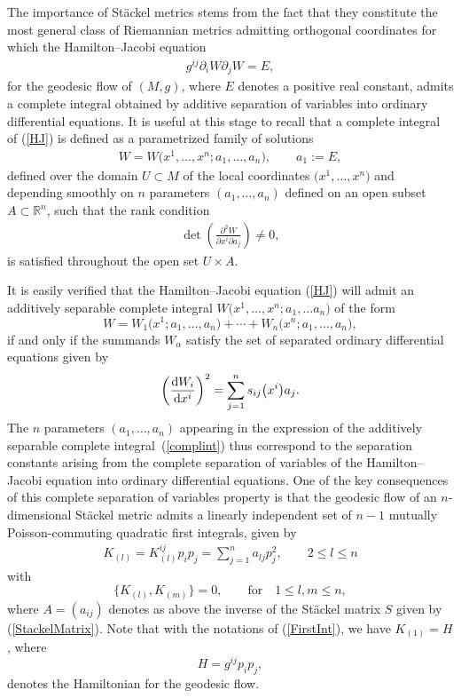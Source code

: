 \documentclass[pdftex]{sigma}
\numberwithin{equation}{section}
\begin{document}
The importance of St\"ackel metrics stems from the fact that they constitute the most general class of Riemannian metrics admitting orthogonal coordinates for which the Hamilton--Jacobi equation
\begin{gather}\label{HJ}
g^{ij}\partial_{i}W\partial_{j}W=E,
\end{gather}
for the geodesic flow of $(M,g)$, where $E$ denotes a positive real constant, admits a complete integral obtained by additive separation of variables into ordinary differential equations. It is useful at this stage to recall that a complete integral of (\ref{HJ}) is defined as a parametrized family of solutions
\begin{gather}\label{complint}
W=W\big(x^{1},\dots,x^{n};a_{1},\dots,a_{n}\big),\qquad a_{1}:=E,
\end{gather}
defined over the domain $U\subset M$ of the local coordinates $\big(x^{1},\dots,x^{n}\big)$ and depending smoothly on $n$ parameters $(a_{1},\dots,a_{n})$ defined on an open subset $A\subset {\mathbb{R}}^{n}$, such that the rank condition
\begin{gather*}%
\det \left(\frac{\partial^{2}W}{\partial x^{i}\partial a_{j}}\right) \neq 0,
\end{gather*}
is satisfied throughout the open set $U\times A$.

It is easily verified that the Hamilton--Jacobi equation (\ref{HJ}) will admit an additively separable complete integral $W\big(x^{1},\dots, x^{n};a_{1},\dots a_{n}\big)$ of the form
\[
W=W_{1}\big(x^{1};a_{1},\dots, a_{n}\big)+\cdots+W_{n}\big(x^{n};a_{1},\dots, a_{n}\big),
\]
if and only if the summands $W_{\alpha}$ satisfy the set of separated ordinary differential equations given by
\[
\left(\frac{{\rm d}W_{i}}{{\rm d}x^{i}}\right)^{2}=\sum_{j=1}^{n}s_{ij}\big(x^{i}\big)a_{j}.
\]
The $n$ parameters $(a_{1},\dots , a_{n})$ appearing in the expression of the additively separable complete integral~(\ref{complint}) thus correspond to the separation constants arising from the complete separation of variables of the Hamilton--Jacobi equation into ordinary differential equations.
One of the key consequences of this complete separation of variables property is that the geodesic flow of an $n$-dimensional St\"ackel metric admits a linearly independent set of $n-1$ mutually Poisson-commuting quadratic first integrals, given by
\begin{gather}\label{FirstInt}
K_{(l)} = K_{(l)}^{ij} p_i p_j = \sum_{j=1}^{n}a_{lj} p_{j}^{2}, \qquad 2\leq l \leq n
\end{gather}
with
\[ \big\{K_{(l)},K_{(m)}\big\}=0,\qquad \text{for} \quad 1\leq l,m \leq n,
\]
where $A=(a_{ij})$ denotes as above the inverse of the St\"ackel matrix $S$ given by (\ref{StackelMatrix}). Note that with the notations of (\ref{FirstInt}), we have $K_{(1)}=H$, where
\[
H=g^{ij}p_{i}p_{j},
\]
denotes the Hamiltonian for the geodesic flow.
\end{document}
